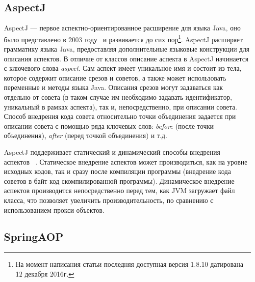 \documentclass[conference]{IEEEtran}
\begin{document}
\subsection{AspectJ}
AspectJ --- первое аспектно-ориентированное расширение для языка Java, оно 
было представлено в 2003 году~\cite{kiczales_aspectj} и развивается до сих 
пор\footnote{На момент написания статьи последняя доступная версия 1.8.10 
датирована 12 декабря 2016г.}.
AspectJ расширяет грамматику языка Java, предоставляя дополнительные языковые
конструкции для описания аспектов.
В отличие от классов описание аспекта в AspectJ начинается с ключевого слова
\textit{aspect}. Сам аспект имеет уникальное имя и состоит из тела, которое 
содержит описание срезов и советов, а также может использовать переменные и 
методы языка Java.
Описания срезов могут задаваться как отдельно от совета (в таком случае им
необходимо задавать идентификатор, уникальный в рамках аспекта), так и,
непосредственно, при описании совета.
Способ внедрения кода совета относительно точки объединения задается при
описании совета с помощью ряда ключевых слов: \textit{before} (после точки
объединения), \textit{after} (перед точкой объединения) и т.д.

AspectJ поддерживает статический и динамический способы внедрения аспектов~
\cite{aspectj_doc}.
Статическое внедрение аспектов может производиться, как на уровне исходных
кодов, так и сразу после компиляции программы (внедрение кода советов в байт-код
скомпилированной программы).
Динамическое внедрение аспектов производится непосредственно перед тем, как JVM
загружает файл класса, что позволяет увеличить производительность, по сравнению
с использованием прокси-объектов.


\subsection{SpringAOP}
\end{document}
